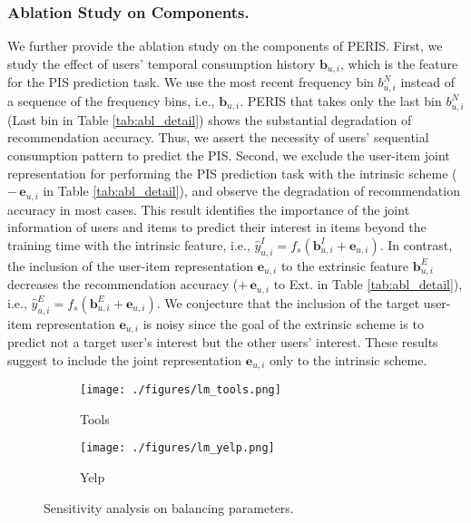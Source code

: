 \documentclass[sigconf]{acmart}
\newcommand{\MD}{{\small\textsf{PERIS}}}
\begin{document}
\subsubsection{\textbf{Ablation Study on Components.}}
We further provide the ablation study on the components of \MD{}. 
First, we study the effect of users' temporal consumption history $\textbf{b}_{u,i}$, which is the feature for the PIS prediction task. We use the most recent frequency bin $b_{u,i}^N$ instead of a sequence of the frequency bins, i.e., $\textbf{b}_{u,i}$. 
\MD{} that takes only the last bin $b_{u,i}^N$ (Last bin in Table \ref{tab:abl_detail}) shows the substantial degradation of recommendation accuracy.
Thus, we assert the necessity of users' sequential consumption pattern to predict the PIS. 
Second, we exclude the user-item joint representation for performing the PIS prediction task with the intrinsic scheme ($-\,\textbf{e}_{u,i}$ in Table \ref{tab:abl_detail}), and observe the degradation of recommendation accuracy in most cases. This result identifies the importance of the joint information of users and items to predict their interest in items beyond the training time with the intrinsic feature, i.e., $\hat{y}_{u,i}^I = f_s(\textbf{b}_{u,i}^I + \textbf{e}_{u,i})$. In contrast, the inclusion of the user-item representation $\textbf{e}_{u,i}$ to the extrinsic feature $\textbf{b}_{u,i}^E$ decreases the recommendation accuracy ($+\,\textbf{e}_{u,i}$ to Ext. in Table \ref{tab:abl_detail}), i.e., $\hat{y}_{u,i}^E = f_s(\textbf{b}_{u,i}^E + \textbf{e}_{u,i})$. We conjecture that the inclusion of the target user-item representation $\textbf{e}_{u,i}$ is noisy since the goal of the extrinsic scheme is to predict not a target user's interest but the other users' interest. These results suggest to include the joint representation $\textbf{e}_{u,i}$ only to the intrinsic scheme.



\begin{figure}
     \centering
     \begin{subfigure}[b]{0.475\linewidth}
         \centering
         \texttt{[image: ./figures/lm\_tools.png]}
         \caption{Tools}
         \label{fig:sense_train}
     \end{subfigure}
     \begin{subfigure}[b]{0.475\linewidth}
         \centering
         \texttt{[image: ./figures/lm\_yelp.png]}
         \caption{Yelp}
         \label{fig:sense_test}
     \end{subfigure}
     \caption{Sensitivity analysis on balancing parameters.}
     \label{fig:sensitivity}
\end{figure}
\end{document}

